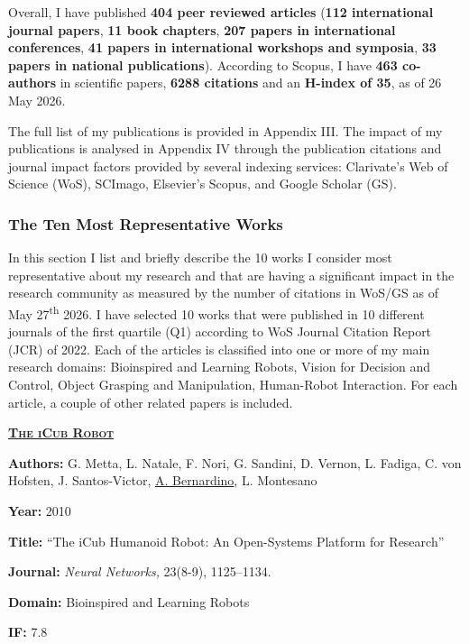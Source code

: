 \documentclass[
]{article}
\begin{document}
Overall, I have published \textbf{404 peer reviewed articles}
(\textbf{112 international journal papers}, \textbf{11 book chapters},
\textbf{207 papers in international conferences}, \textbf{41 papers in
international workshops and symposia}, \textbf{33 papers in national
publications}). According to Scopus, I have \textbf{463 co-authors} in
scientific papers, \textbf{6288 citations} and an \textbf{H-index of
35}, as of 26 May 2026.

The full list of my publications is provided in Appendix III. The impact
of my publications is analysed in Appendix IV through the publication
citations and journal impact factors provided by several indexing
services: Clarivate's Web of Science (WoS), SCImago, Elsevier's Scopus,
and Google Scholar (GS).

\subsubsection*{The Ten Most Representative
Works}\label{the-ten-most-representative-works}

In this section I list and briefly describe the 10 works I consider most
representative about my research and that are having a significant
impact in the research community as measured by the number of citations
in WoS/GS as of May 27\textsuperscript{th} 2026. I have selected 10
works that were published in 10 different journals of the first quartile
(Q1) according to WoS Journal Citation Report (JCR) of 2022. Each of the
articles is classified into one or more of my main research domains:
Bioinspired and Learning Robots, Vision for Decision and Control, Object
Grasping and Manipulation, Human-Robot Interaction. For each article, a
couple of other related papers is included.

\textbf{\textsc{\ul{The iCub Robot}}}

\textbf{Authors:} G. Metta, L. Natale, F. Nori, G. Sandini, D. Vernon,
L. Fadiga, C. von Hofsten, J. Santos-Victor, \ul{A. Bernardino}, L.
Montesano

\textbf{Year:} 2010

\textbf{Title:} ``The iCub Humanoid Robot: An Open-Systems Platform for
Research''

\textbf{Journal:} \emph{Neural Networks,} 23(8-9), 1125--1134.

\textbf{Domain:} Bioinspired and Learning Robots

\textbf{IF:} 7.8
\end{document}

